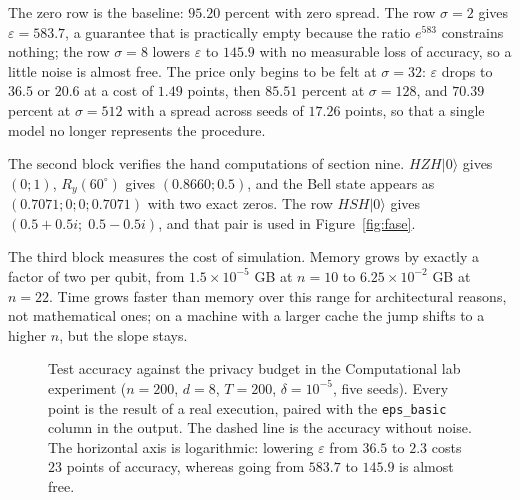 The zero row is the baseline: $95.20$ percent with zero spread. The row $\sigma=2$ gives
$\varepsilon=583.7$, a guarantee that is practically empty because the ratio $e^{583}$
constrains nothing; the row $\sigma=8$ lowers $\varepsilon$ to $145.9$ with no measurable
loss of accuracy, so a little noise is almost free. The price only begins to be felt at
$\sigma=32$: $\varepsilon$ drops to $36.5$ or $20.6$ at a cost of $1.49$ points, then
$85.51$ percent at $\sigma=128$, and $70.39$ percent at $\sigma=512$ with a spread across
seeds of $17.26$ points, so that a single model no longer represents the procedure.

The second block verifies the hand computations of section nine. $HZH|0\rangle$ gives
$(0;1)$, $R_y(60^\circ)$ gives $(0.8660;0.5)$, and the Bell state appears as
$(0.7071;0;0;0.7071)$ with two exact zeros. The row $HSH|0\rangle$ gives
$(0.5+0.5i;\;0.5-0.5i)$, and that pair is used in Figure~\ref{fig:fase}.

The third block measures the cost of simulation. Memory grows by exactly a factor of two
per qubit, from $1.5\times10^{-5}$ GB at $n=10$ to $6.25\times10^{-2}$ GB at $n=22$. Time
grows faster than memory over this range for architectural reasons, not mathematical ones;
on a machine with a larger cache the jump shifts to a higher $n$, but the slope stays.

\begin{figure}
\centering
{}
\caption{Test accuracy against the privacy budget in the Computational lab experiment
($n=200$, $d=8$, $T=200$, $\delta=10^{-5}$, five seeds). Every point is the result of a
real execution, paired with the \texttt{eps\_basic} column in the output. The dashed line
is the accuracy without noise. The horizontal axis is logarithmic: lowering
$\varepsilon$ from $36.5$ to $2.3$ costs $23$ points of accuracy, whereas going from
$583.7$ to $145.9$ is almost free.}
\label{fig:tradeoff}
\end{figure}

